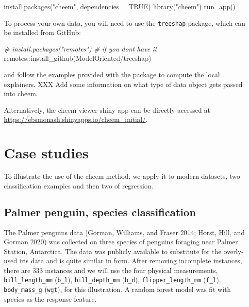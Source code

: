 \documentclass[
]{article}
\newenvironment{Shaded}{\begin{snugshade}}{\end{snugshade}}
\newcommand{\AttributeTok}[1]{\textcolor[rgb]{0.77,0.63,0.00}{#1}}
\newcommand{\CommentTok}[1]{\textcolor[rgb]{0.56,0.35,0.01}{\textit{#1}}}
\newcommand{\ConstantTok}[1]{\textcolor[rgb]{0.00,0.00,0.00}{#1}}
\newcommand{\FunctionTok}[1]{\textcolor[rgb]{0.00,0.00,0.00}{#1}}
\newcommand{\NormalTok}[1]{#1}
\newcommand{\SpecialCharTok}[1]{\textcolor[rgb]{0.00,0.00,0.00}{#1}}
\newcommand{\StringTok}[1]{\textcolor[rgb]{0.31,0.60,0.02}{#1}}
\begin{document}
\begin{Shaded}
\begin{Highlighting}[]
\FunctionTok{install.packages}\NormalTok{(}\StringTok{"cheem"}\NormalTok{, }\AttributeTok{dependencies =} \ConstantTok{TRUE}\NormalTok{)}
\FunctionTok{library}\NormalTok{(}\StringTok{"cheem"}\NormalTok{)}
\FunctionTok{run\_app}\NormalTok{()}
\end{Highlighting}
\end{Shaded}

To process your own data, you will need to use the \texttt{treeshap} package, which can be installed from GitHub:

\begin{Shaded}
\begin{Highlighting}[]
\CommentTok{\# install.packages("remotes") \# if you don\textquotesingle{}t have it}
\NormalTok{remotes}\SpecialCharTok{::}\FunctionTok{install\_github}\NormalTok{(}\StringTok{\textquotesingle{}ModelOriented/treeshap\textquotesingle{}}\NormalTok{)}
\end{Highlighting}
\end{Shaded}

and follow the examples provided with the package to compute the local explainers. XXX Add some information on what type of data object gets passed into cheem.

Alternatively, the cheem viewer shiny app can be directly accessed at \url{https://ebsmonash.shinyapps.io/cheem_initial/}.

\hypertarget{sec:casestudies}{%
\section{Case studies}\label{sec:casestudies}}

To illustrate the use of the cheem method, we apply it to modern datasets, two classification examples and then two of regression.

\hypertarget{palmer-penguin-species-classification}{%
\subsection{Palmer penguin, species classification}\label{palmer-penguin-species-classification}}

The Palmer penguins data (Gorman, Williams, and Fraser 2014; Horst, Hill, and Gorman 2020) was collected on three species of penguins foraging near Palmer Station, Antarctica. The data was publicly available to substitute for the overly-used iris data and is quite similar in form. After removing incomplete instances, there are 333 instances and we will use the four physical measurements, \texttt{bill\_length\_mm} (\texttt{b\_l}), \texttt{bill\_depth\_mm} (\texttt{b\_d}), \texttt{flipper\_length\_mm} (\texttt{f\_l}), \texttt{body\_mass\_g} (\texttt{wgt}), for this illustration. A random forest model was fit with species as the response feature.
\end{document}
